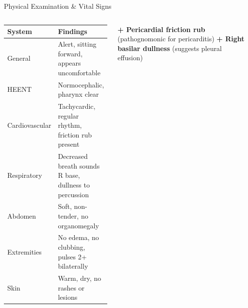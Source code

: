 \begin{frame}{Physical Examination \& Vital Signs}
\begin{columns}[T]
    \begin{tcolorbox}[infobox,title={\faFile\hspace{4pt}Physical Examination}]
      \small
      \renewcommand{\arraystretch}{1.3}
      \begin{tabular}{@{}>{\raggedright\arraybackslash}p{}>{\raggedright\arraybackslash}p{}@{}}
        \toprule
        \textbf{System} & \textbf{Findings} \\
        \midrule
        General & Alert, sitting forward, appears uncomfortable \\
        HEENT & Normocephalic, pharynx clear \\
        Cardiovascular & Tachycardic, regular rhythm, friction rub present \\
        Respiratory & Decreased breath sounds R base, dullness to percussion \\
        Abdomen & Soft, non-tender, no organomegaly \\
        Extremities & No edema, no clubbing, pulses 2+ bilaterally \\
        Skin & Warm, dry, no rashes or lesions \\
        \bottomrule
      \end{tabular}
    \end{tcolorbox}

    \vspace{0.2cm}

    \begin{tcolorbox}[alertbox,title={\faSearch\hspace{4pt}Pertinent Positives}]
      \small
      \textbf{+ Pericardial friction rub} (pathognomonic for pericarditis)
      \hspace{1cm}
      \textbf{+ Right basilar dullness} (suggests pleural effusion)
    \end{tcolorbox}
  \end{columns}
\end{frame}
